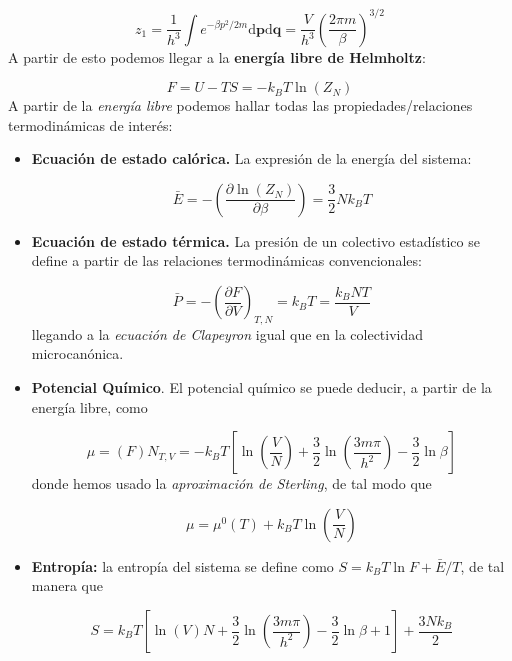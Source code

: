 \documentclass[12pt,a4paper]{article}
\numberwithin{equation}{section}
\numberwithin{figure}{section}
\newcommand{\parentesis}[1]{\left( #1  \right)}
\newcommand{\parciales}[2]{\frac{\partial #1}{\partial #2}}
\newcommand{\pparciales}[2]{\parentesis{\parciales{#1}{#2}}}
\newcommand{\ccorchetes}[1]{\left[ #1  \right]}
\newcommand{\D}{\mathrm{d}}
\newcommand{\pn}{\mathbf{p}}
\newcommand{\qn}{\mathbf{q}}
\theoremstyle{definition}
\begin{document}
\begin{equation}
z_1 = \frac{1}{h^3} \int e^{- \beta p^2/2m}\D \pn \D \qn = \frac{V}{h^3} \parentesis{\frac{2 \pi m}{\beta}}^{3/2}
\end{equation}
A partir de esto podemos llegar a la \textbf{energía libre de Helmholtz}:

\begin{equation}
F = U -  TS = - k_B T \ln (Z_N) 
\end{equation}
A partir de la \textit{energía libre} podemos hallar todas las propiedades/relaciones termodinámicas de interés: 

\begin{itemize}
\item \textbf{Ecuación de estado calórica.} La expresión de la energía del sistema:

\begin{equation}
\bar{E} = - \pparciales{\ln(Z_N)}{\beta} = \frac{3}{2} N k_B T
\end{equation}
\item \textbf{Ecuación de estado térmica.} La presión de un colectivo estadístico se define a partir de las relaciones termodinámicas convencionales:

\begin{equation}
\bar{P}  = - \pparciales{F}{V}_{T,N} = k_B T = \frac{k_B N T}{V}
\end{equation}
llegando a la \textit{ecuación de Clapeyron} igual que en la colectividad microcanónica. \\

\item \textbf{Potencial Químico}. El potencial químico se puede deducir, a partir de la energía libre, como

\begin{equation}
\mu = \parentesis{F}{N}_{T,V} = - k_B T \ccorchetes{\ln \parentesis{\frac{V}{N}}  + \frac{3}{2} \ln \parentesis{\frac{3m\pi}{h^2}} - \frac{3}{2} \ln \beta }
\end{equation}
donde hemos usado la \textit{aproximación de Sterling}, de tal modo que

\begin{equation}
\mu = \mu^0 (T) + k_B T \ln \parentesis{\frac{V}{N}}
\end{equation}
\item \textbf{Entropía:} la entropía del sistema se define como $S=k_BT\ln F + \bar{E}/T$, de tal manera que 

\begin{equation}
S = k_B T \ccorchetes{\ln \parentesis{V}{N} + \frac{3}{2} \ln \parentesis{\frac{3m \pi}{h^2}}- \frac{3}{2} \ln \beta +1} + \frac{3Nk_B}{2}
\end{equation}
\end{itemize}
\end{document}
